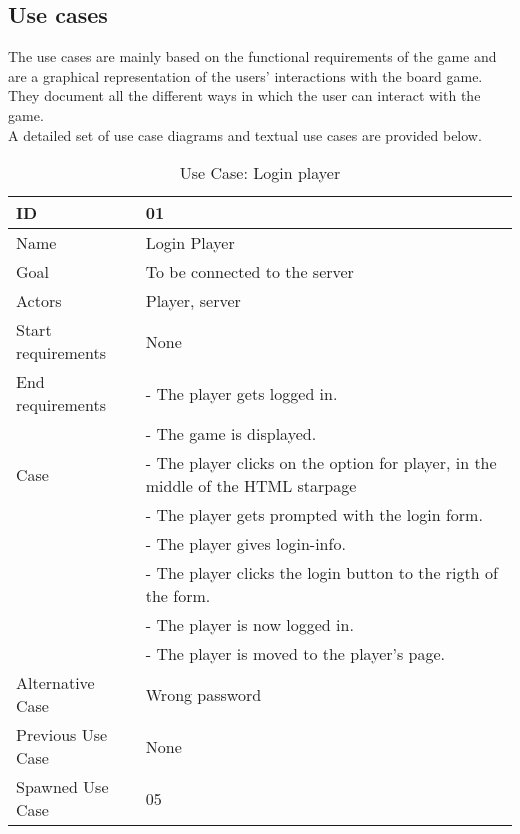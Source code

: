 \subsection{Use cases}
The use cases are mainly based on the functional requirements of the game and are a graphical representation of the users’ interactions with the board game. They document all the different ways in which the user can interact with the game. 
\\
A detailed set of use case diagrams and textual use cases are provided below.\\


\begin{table}[H]
\begin{tabular}{|l|l|} \hline
	\textbf{ID} & \textbf{01}\\ \hline
	Name & Login Player\\ \hline
	Goal & To be connected to the server\\ \hline
	Actors & Player, server\\ \hline
	Start requirements & None\\ \hline
	End requirements & - The player gets logged in.\\
					 & - The game is displayed.\\ \hline
	Case & - The player clicks on the option for player, in the middle of the HTML starpage\\
			& - The player gets prompted with the login form. \\
		 	& - The player gives login-info.\\
			& - The player clicks the login button to the rigth of the form.\\
			& - The player is now logged in.\\ 
			& - The player is moved to the player's page. \\ \hline
	Alternative Case & Wrong password\\ \hline
	Previous Use Case & None\\ \hline
	Spawned Use Case & 05\\ \hline
\end{tabular}
\caption{Use Case: Login player}
\label{fig:usecase01table}
\end{table}


